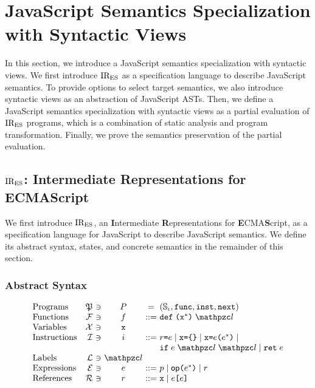 \section{JavaScript Semantics Specialization with Syntactic Views}\label{sec:formal}

In this section, we introduce a JavaScript semantics specialization with
syntactic views.  We first introduce $\text{IR}_\text{ES}$ as a specification language to
describe JavaScript semantics. To provide options to select target semantics, we
also introduce syntactic views as an abstraction of JavaScript ASTs.  Then, we
define a JavaScript semantics specialization with syntactic views as a partial
evaluation of $\text{IR}_\text{ES}$ programs, which is a combination of static analysis and
program transformation. Finally, we prove the semantics preservation of the
partial evaluation.

\subsection{$\text{IR}_\text{ES}$: Intermediate Representations for ECMAScript}

We first introduce $\text{IR}_\text{ES}$, an \textbf{I}ntermediate \textbf{R}epresentations
for \textbf{E}CMA\textbf{S}cript, as a specification language for JavaScript to
describe JavaScript semantics. We define its abstract syntax, states, and
concrete semantics in the remainder of this section.

\subsubsection{Abstract Syntax}

\[
  \begin{array}{lr@{~}c@{~}c@{~}c@{~}l}
    \text{Programs} & \progset &\ni& \prog &=& (\istset, \getfunc, \getinst,
    \getnext)\\

    \text{Functions} & \funcset &\ni& \func &::=&
    \kwdef \; \kwrl \varx^* \kwrr \; \lab\\

    \text{Variables} & \varset &\ni& \varx\\

    \text{Instructions} & \instset &\ni& \inst &::=&
    \refer \kweq \expr \mid
    \varx \kweq \kwcl \kwcr \mid
    \varx \kweq \expr \kwrl \expr^* \kwrr \mid \\&&&&&
    \kwif \; \expr \; \lab \; \lab \mid
    \kwret \; \expr\\

    \text{Labels} & \labset &\ni& \lab\\

    \text{Expressions} & \exprset &\ni& \expr &::=&
    \pval \mid
    \op \kwrl \expr^* \kwrr \mid
    \refer\\

    \text{References} & \referset &\ni& \refer &::=&
    \varx \mid \expr \kwsl \expr \kwsr\\
  \end{array}
\]

